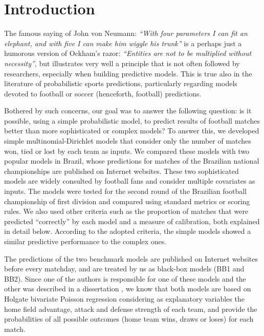 \documentclass[journal,article,accept,moreauthors,pdftex,12pt,a4paper]{mdpi}
\begin{document}
	
	
	\section{Introduction}
	
	The famous saying of John von Neumann: {\it ``With four parameters I can fit an elephant, and with five I can make him wiggle his trunk''} is a perhaps just a humorous version of Ockham's razor:
	{\it``Entities are not to be multiplied without necessity''}, but illustrates very well a principle that is not often followed by researchers, especially when building predictive models.
	This is true also in the literature of probabilistic sports predictions, particularly regarding models devoted to football or soccer (henceforth, football) predictions.
	
	Bothered by such concerns, our goal was to answer the following question: is it possible, using a simple probabilistic model, to predict results of football matches better than more sophisticated or complex models?
	{\color{blue}To answer this, we developed simple multinomial-Dirichlet models that consider only the number of matches won, tied or lost by each team as inputs. We compared these models with two popular models in Brazil, whose predictions for matches of the Brazilian national championships are published on Internet websites. These two sophisticated models are widely consulted by football fans and consider multiple covariates as inputs.}
	The models were tested for the second round of the Brazilian football championship of first division and compared using standard metrics or scoring rules. 
	We also used other criteria such as the proportion of matches that were predicted ``correctly'' by each model and a measure of calibration, both explained in detail below.
	According to the adopted criteria, the simple models showed a similar predictive performance to the complex ones.
	
	The predictions of the two benchmark models are published on Internet websites before every matchday, and are treated by us as black-box models (BB1 and BB2).
	Since one of the authors is responsible for one of these models and the other was described in a dissertation \citep{arruda2000}, we know that both models are based on Holgate bivariate Poisson regression considering as explanatory variables the home field advantage, attack and defense strength of each team, and provide the probabilities of all possible outcomes (home team wins, draws or loses) for each match.
\end{document}
